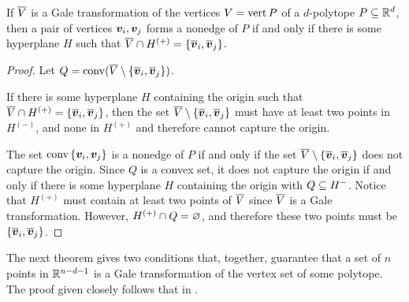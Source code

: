 \begin{Corollary}\label{Cor:Nonedge}
    If \(\overline{V}\) is a Gale transformation of the vertices \(V=\operatorname{vert} P\) of a \(d\)-polytope \(P\subseteq\mathbb{R}^{d}\), then a pair of vertices \(\bm{v}_i,\bm{v}_j\) forms a nonedge of \(P\) if and only if there is some hyperplane \(H\) such that \(\overline{V}\cap H^{(+)}=\left\{\overline{\bm{v}}_i,\overline{\bm{v}}_j\right\}\).
\end{Corollary}
\begin{proof}
    Let \(Q=\operatorname{conv}(\overline{V}\setminus\left\{\overline{\bm{v}}_i,\overline{\bm{v}}_j\right\})\).

    If there is some hyperplane \(H\) containing the origin such that \(\overline{V}\cap H^{(+)}=\left\{\overline{\bm{v}}_i,\overline{\bm{v}}_j\right\}\), then the set \(\overline{V}\setminus\left\{\overline{\bm{v}}_i,\overline{\bm{v}}_j\right\}\) must have at least two points in \(H^{(-)}\), and none in \(H^{(+)}\) and therefore cannot capture the origin.

    The set \(\operatorname{conv}\left\{\bm{v}_i,\bm{v}_j\right\}\) is a nonedge of \(P\) if and only if the set \(\overline{V}\setminus\left\{\overline{\bm{v}}_i,\overline{\bm{v}}_j\right\}\) does not capture the origin.  Since \(Q\) is a convex set, it does not capture the origin if and only if there is some hyperplane \(H\) containing the origin with \(Q\subseteq H^-\).  Notice that \(H^{(+)}\) must contain at least two points of \(\overline{V}\) since \(\overline{V}\) is a Gale transformation.  However, \(H^{(+)}\cap Q=\varnothing\), and therefore these two points must be \(\left\{\overline{\bm{v}}_i,\overline{\bm{v}}_j\right\}\).
\end{proof}

The next theorem gives two conditions that, together, guarantee that a set of \(n\) points in \(\mathbb{R}^{n-d-1}\) is a Gale transformation of the vertex set of some polytope.  The proof given closely follows that in \cite{McMullenBook}.

